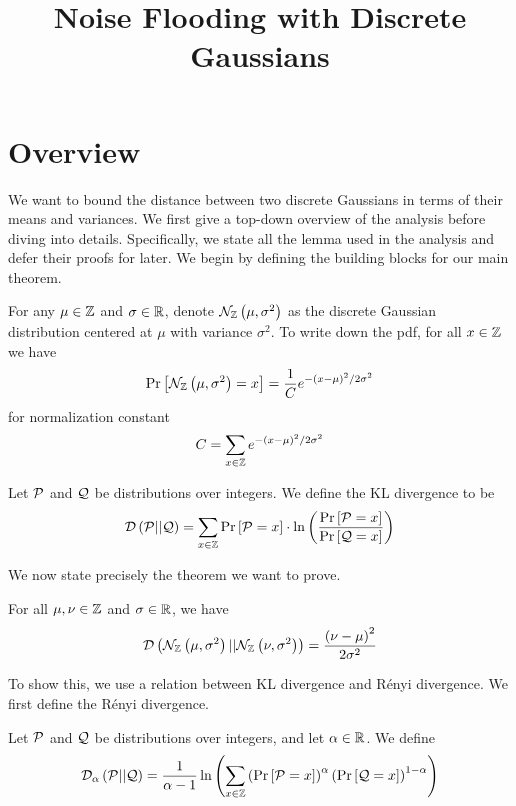 \documentclass{article}
\title{Noise Flooding with Discrete Gaussians}
\author{}
\begin{document}
\maketitle

\section{Overview}

We want to bound the distance between two discrete Gaussians in terms of their means and variances.
We first give a top-down overview of the analysis before diving into details.
Specifically, we state all the lemma used in the analysis and defer their proofs for later.
We begin by defining the building blocks for our main theorem.

\begin{definition}
	For any $\mu\in\mathbb{Z}$ and $\sigma\in\mathbb{R}$, denote $\mathcal{N}_{\mathbb{Z}}\left(\mu, \sigma^2\right)$ as the discrete Gaussian distribution centered at $\mu$ with variance $\sigma^2$.
	To write down the pdf, for all $x\in\mathbb{Z}$ we have
	\begin{equation}
		\Pr\left[\mathcal{N}_{\mathbb{Z}}\left(\mu, \sigma^2\right)=x\right]=\frac{1}{C}e^{-\left(x-\mu\right)^2/2\sigma^2}
	\end{equation}
	for normalization constant
	\begin{equation}
		C=\sum_{x\in\mathbb{Z}} e^{-\left(x-\mu\right)^2/2\sigma^2}
	\end{equation}
\end{definition}

\begin{definition}
	Let $\mathcal{P}$ and $\mathcal{Q}$ be distributions over integers.
	We define the KL divergence to be
	\begin{equation}
		\mathcal{D}\left(\mathcal{P} || \mathcal{Q}\right) = \sum_{x\in\mathbb{Z}}\Pr\left[\mathcal{P} = x\right]\cdot
		\ln\left(\frac{\Pr\left[\mathcal{P}=x\right]}{\Pr\left[\mathcal{Q}=x\right]}\right)
	\end{equation}
\end{definition}

We now state precisely the theorem we want to prove.

\begin{theorem}
	For all $\mu, \nu\in\mathbb{Z}$ and $\sigma\in\mathbb{R}$, we have
	\begin{equation}
		\mathcal{D}\left(\mathcal{N}_{\mathbb{Z}}\left(\mu, \sigma^2\right) || \mathcal{N}_{\mathbb{Z}}\left(\nu, \sigma^2\right)\right) = \frac{\left(\nu - \mu\right)^2}{2\sigma^2}
	\end{equation}
\end{theorem}

To show this, we use a relation between KL divergence and R\'enyi divergence.
We first define the R\'enyi divergence.
\begin{definition}
	Let $\mathcal{P}$ and $\mathcal{Q}$ be distributions over integers, and let $\alpha\in\mathbb{R}$.
	We define
	\begin{equation}
		\mathcal{D}_\alpha\left(\mathcal{P} || \mathcal{Q}\right) = \frac{1}{\alpha - 1}
		\ln\left(\sum_{x\in\mathbb{Z}}
		\left(\Pr\left[\mathcal{P}=x\right]\right)^\alpha
		\left(\Pr\left[\mathcal{Q}=x\right]\right)^{1-\alpha}\right)
	\end{equation}
\end{definition}
\end{document}
